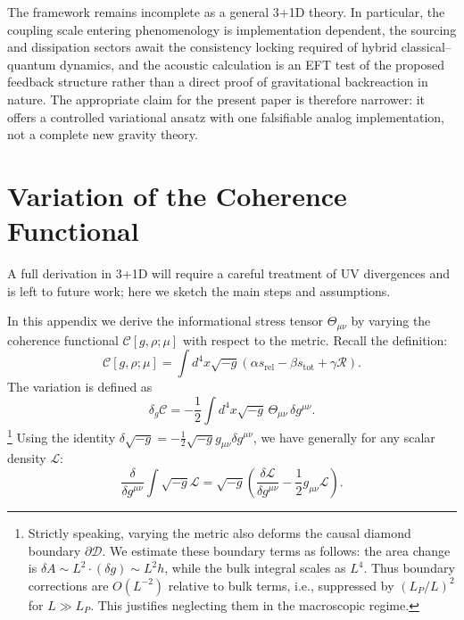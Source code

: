 \documentclass[aps,prd,twocolumn,superscriptaddress,nofootinbib,floatfix]{revtex4-2}
\newcommand{\Cfunc}{\mathcal{C}}
\newcommand{\Ddom}{\mathcal{D}}
\newcommand{\Rdens}{\mathcal{R}}
\newcommand{\Tmn}{\Theta_{\mu\nu}}
\newcommand{\sr}{s_{\mathrm{rel}}}
\newcommand{\stot}{s_{\mathrm{tot}}}
\begin{document}
The framework remains incomplete as a general 3+1D theory. In particular, the coupling scale entering phenomenology is implementation dependent, the sourcing and dissipation sectors await the consistency locking required of hybrid classical--quantum dynamics, and the acoustic calculation is an EFT test of the proposed feedback structure rather than a direct proof of gravitational backreaction in nature. The appropriate claim for the present paper is therefore narrower: it offers a controlled variational ansatz with one falsifiable analog implementation, not a complete new gravity theory.


\appendix

\section{Variation of the Coherence Functional}
\label{appendix:variation}

A full derivation in 3+1D will require a careful treatment of UV divergences and is left to future work; here we sketch the main steps and assumptions.

In this appendix we derive the informational stress tensor $\Tmn$ by varying the coherence functional $\Cfunc[g,\rho;\mu]$ with respect to the metric.
Recall the definition:
\begin{equation}
    \Cfunc[g,\rho;\mu] = \int d^4x \sqrt{-g} \left( \alpha \sr - \beta \stot + \gamma \Rdens \right).
\end{equation}
The variation is defined as
\begin{equation}
    \delta_g \Cfunc = - \frac{1}{2} \int d^4x \sqrt{-g} \, \Tmn \, \delta g^{\mu\nu}.
\end{equation}
\footnote{Strictly speaking, varying the metric also deforms the causal diamond boundary $\partial \Ddom$. We estimate these boundary terms as follows: the area change is $\delta A \sim L^2 \cdot (\delta g) \sim L^2 h$, while the bulk integral scales as $L^4$. Thus boundary corrections are $O(L^{-2})$ relative to bulk terms, i.e., suppressed by $(L_P/L)^2$ for $L \gg L_P$. This justifies neglecting them in the macroscopic regime.}
Using the identity $\delta \sqrt{-g} = -\frac{1}{2}\sqrt{-g} g_{\mu\nu} \delta g^{\mu\nu}$, we have generally for any scalar density $\mathcal{L}$:
\begin{equation}
    \frac{\delta}{\delta g^{\mu\nu}} \int \sqrt{-g} \mathcal{L} = \sqrt{-g} \left( \frac{\delta \mathcal{L}}{\delta g^{\mu\nu}} - \frac{1}{2} g_{\mu\nu} \mathcal{L} \right).
\end{equation}
\end{document}
